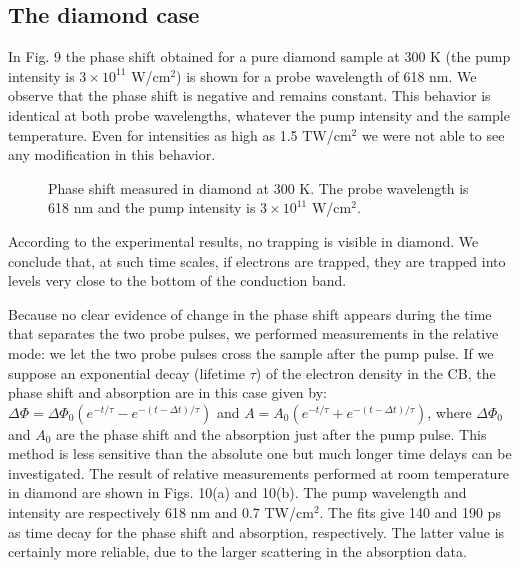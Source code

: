 \documentclass[aps,prb,reprint]{revtex4-2}
\begin{document}
\subsection{The diamond case}

In Fig. 9 the phase shift obtained for a pure diamond sample at 300 K (the pump intensity is $3\times 10^{11}$ W/cm$^2$) is shown for a probe wavelength of 618 nm. We observe that the phase shift is negative and remains constant. This behavior is identical at both probe wavelengths, whatever the pump intensity and the sample temperature. Even for intensities as high as 1.5 TW/cm$^2$ we were not able to see any modification in this behavior.

\begin{figure}[ht]
    \centering
    \caption{Phase shift measured in diamond at 300 K. The probe wavelength is 618 nm and the pump intensity is $3\times10^{11}$ W/cm$^2$.}
    \label{fig:diamond}
\end{figure}

According to the experimental results, no trapping is visible in diamond. We conclude that, at such time scales, if electrons are trapped, they are trapped into levels very close to the bottom of the conduction band.

Because no clear evidence of change in the phase shift appears during the time that separates the two probe pulses, we performed measurements in the relative mode: we let the two probe pulses cross the sample after the pump pulse. If we suppose an exponential decay (lifetime $\tau$) of the electron density in the CB, the phase shift and absorption are in this case given by: $\Delta\Phi = \Delta\Phi_0 (e^{-t/\tau} - e^{-(t-\Delta t)/\tau})$ and $A = A_0 (e^{-t/\tau} + e^{-(t-\Delta t)/\tau})$, where $\Delta\Phi_0$ and $A_0$ are the phase shift and the absorption just after the pump pulse. This method is less sensitive than the absolute one but much longer time delays can be investigated. The result of relative measurements performed at room temperature in diamond are shown in Figs. 10(a) and 10(b). The pump wavelength and intensity are respectively 618 nm and 0.7 TW/cm$^2$. The fits give 140 and 190 ps as time decay for the phase shift and absorption, respectively. The latter value is certainly more reliable, due to the larger scattering in the absorption data.
\end{document}

